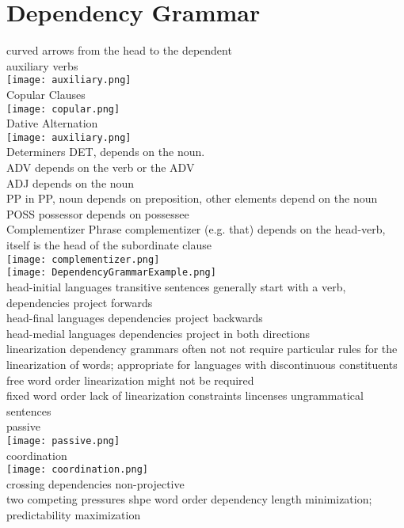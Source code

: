 \section{Dependency Grammar}
{\tiny curved arrows from the head to the dependent}\\
\scriptsize{auxiliary verbs}\\
\texttt{[image: auxiliary.png]}\\
\scriptsize{Copular Clauses}\\
\texttt{[image: copular.png]}\\
\scriptsize{Dative Alternation}\\
\texttt{[image: auxiliary.png]}\\
\scriptsize{Determiners} {\tiny DET, depends on the noun.}\\
\scriptsize{ADV} {\tiny depends on the verb or the ADV}\\
\scriptsize{ADJ} {\tiny depends on the noun}\\
\scriptsize{PP} {\tiny in PP, noun depends on preposition, other elements depend on the noun}\\
\scriptsize{POSS} {\tiny possessor depends on possessee}\\
\scriptsize{Complementizer Phrase} {\tiny complementizer (e.g. that) depends on the head-verb, itself is the head of the subordinate clause}\\
\texttt{[image: complementizer.png]}\\
\texttt{[image: DependencyGrammarExample.png]}\\
\scriptsize{head-initial languages} {\tiny transitive sentences generally start with a verb, dependencies project forwards}\\
\scriptsize{head-final languages}
{\tiny dependencies project backwards}\\
\scriptsize{head-medial languages}
{\tiny dependencies project in both directions}\\
\scriptsize{linearization}
{\tiny dependency grammars often not not require particular rules
for the linearization of words; appropriate for languages with discontinuous constituents}\\
\scriptsize{free word order}
{\tiny linearization might not be required}\\
\scriptsize{fixed word order}
{\tiny lack of linearization constraints lincenses ungrammatical sentences}\\
\scriptsize{passive}\\
\texttt{[image: passive.png]}\\
\scriptsize{coordination}\\
\texttt{[image: coordination.png]}\\
\scriptsize{crossing dependencies}
{\tiny non-projective}\\
\scriptsize{two competing pressures shpe word order}
{\tiny dependency length minimization; predictability maximization}